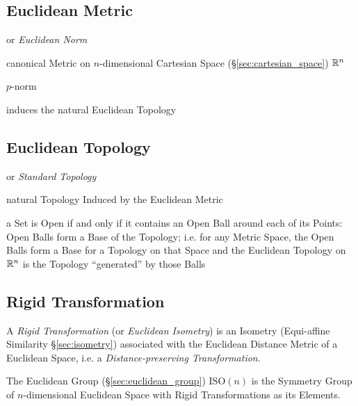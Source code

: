 \subsection{Euclidean Metric}\label{sec:euclidean_metric}

or \emph{Euclidean Norm}

canonical Metric on $n$-dimensional Cartesian Space
(\S\ref{sec:cartesian_space}) $\mathbb{R}^n$

$p$-norm

induces the natural Euclidean Topology



\subsection{Euclidean Topology}\label{sec:euclidean_topology}

or \emph{Standard Topology}

natural Topology Induced by the Euclidean Metric

a Set is Open if and only if it contains an Open Ball around each of its Points:
Open Balls form a Base of the Topology; i.e. for any Metric Space, the Open
Balls form a Base for a Topology on that Space and the Euclidean Topology on
$\mathbb{R}^n$ is the Topology ``generated'' by those Balls



\subsection{Rigid Transformation}\label{sec:rigid_transformation}

A \emph{Rigid Transformation} (or \emph{Euclidean Isometry}) is an Isometry
(Equi-affine Similarity \S\ref{sec:isometry}) associated with the Euclidean
Distance Metric of a Euclidean Space, i.e. a \emph{Distance-preserving
  Transformation}.

The Euclidean Group (\S\ref{sec:euclidean_group}) $\mathrm{ISO}(n)$ is the
Symmetry Group of $n$-dimensional Euclidean Space with Rigid Transformations as
its Elements.

